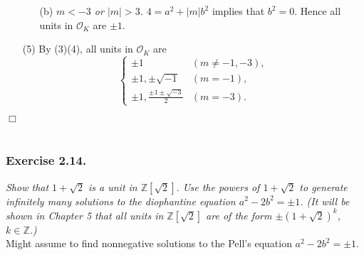 \documentclass{article}
\begin{document}
\begin{enumerate}
\begin{enumerate}
    \item[(b)]
      \emph{$m < -3$ or $|m| > 3$.}
      $4 = a^2 + |m|b^2$ implies that $b^2 = 0$.
      Hence all units in $\mathcal{O}_K$ are $\pm 1$.
    \end{enumerate}

\item[(5)]
  By (3)(4), all units in $\mathcal{O}_K$ are
    \begin{equation*}
      \begin{cases}
        \pm 1                                & (m \neq -1, -3), \\
        \pm 1, \pm \sqrt{-1}                 & (m = -1), \\
        \pm 1, \frac{\pm 1 \pm \sqrt{-3}}{2} & (m = -3).
      \end{cases}
    \end{equation*}
\end{enumerate}
$\Box$ \\\\






\subsubsection*{Exercise 2.14.}
\emph{Show that $1+\sqrt{2}$ is a unit in $\mathbb{Z}[\sqrt{2}]$.
Use the powers of $1+\sqrt{2}$ to generate infinitely many solutions
to the diophantine equation $a^2 - 2b^2 = \pm 1$.
(It will be shown in Chapter 5 that all units in $\mathbb{Z}[\sqrt{2}]$
are of the form $\pm(1+\sqrt{2})^k$, $k \in \mathbb{Z}$.)} \\

Might assume to find nonnegative solutions to the Pell's equation $a^2 - 2b^2 = \pm 1$. \\
\end{document}
